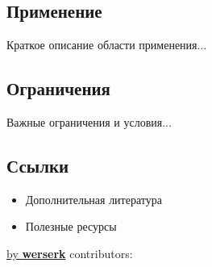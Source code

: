 \documentclass[10pt,landscape,a4paper]{article}
\begin{document}
\begin{multicols}{2}
\subsection{Применение}
Краткое описание области применения...

\subsection{Ограничения}
Важные ограничения и условия...

\subsection{Ссылки}
\begin{itemize}
    \item Дополнительная литература
    \item Полезные ресурсы
\end{itemize}

\end{multicols}

{\noindent \href{https://werserk.com}{\textcolor{accent}{by \textbf{werserk}}} \hfill contributors: \contributorsDisplay}
\end{document}
